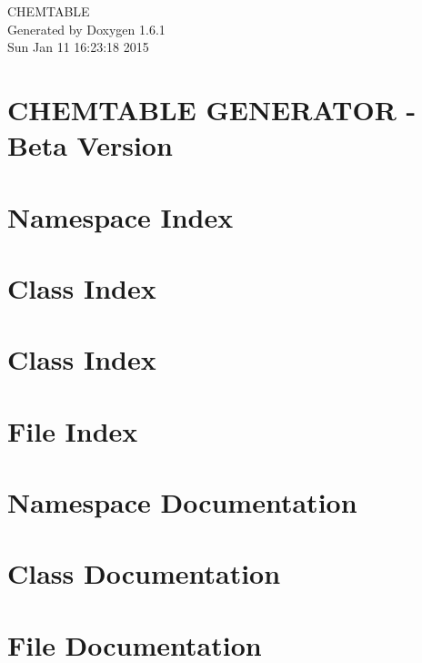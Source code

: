\documentclass[a4paper]{book}
\begin{document}
\hypersetup{pageanchor=false}
\begin{titlepage}
\vspace*{7cm}
\begin{center}
{\Large CHEMTABLE }\\
\vspace*{1cm}
{\large Generated by Doxygen 1.6.1}\\
\vspace*{0.5cm}
{\small Sun Jan 11 16:23:18 2015}\\
\end{center}
\end{titlepage}
\clearemptydoublepage
{}
\tableofcontents
\clearemptydoublepage
{}
\hypersetup{pageanchor=true}
\chapter{CHEMTABLE GENERATOR -\/ Beta Version}
\label{index}\hypertarget{index}{}
\chapter{Namespace Index}

\chapter{Class Index}

\chapter{Class Index}

\chapter{File Index}

\chapter{Namespace Documentation}




\chapter{Class Documentation}




























\chapter{File Documentation}


\printindex
\end{document}
